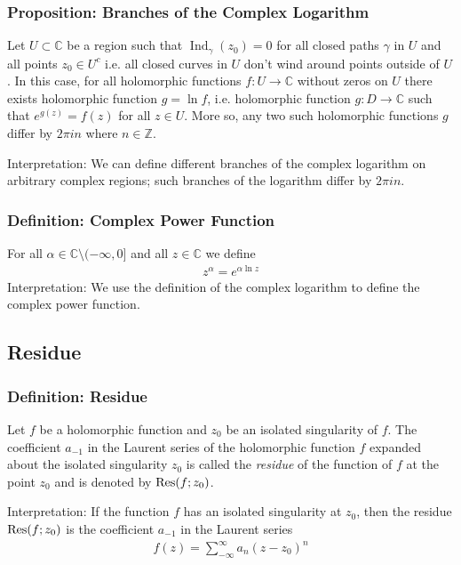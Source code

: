 \documentclass[11pt, a4paper]{article}
\newcommand{\C}{\mathbb{C}} %
\begin{document}
\subsubsection{Proposition: Branches of the Complex Logarithm}
Let $ U \subset \C $ be a region such that $ \operatorname{Ind}_{\gamma}(z_0) = 0$ for all closed paths $ \gamma $ in $ U $ and all points $ z_0 \in U^{c} $ i.e.  all closed curves in $ U $ don't wind around points outside of $ U $. In this case, for all holomorphic functions $ f: U \to \C $ without zeros on $ U $ there exists holomorphic function $ g = \ln f $, i.e. holomorphic function $ g: D \to \C $ such that $ e^{g(z)} = f(z) $ for all $ z \in U $. More so, any two such holomorphic functions $ g $ differ by $ 2\pi i n $ where $ n \in \mathbb{Z} $. 

Interpretation: We can define different branches of the complex logarithm on arbitrary complex regions; such branches of the logarithm differ by $ 2\pi in $.

\subsubsection{Definition: Complex Power Function}
For all $ \alpha \in \C \setminus (-\infty, 0]$ and all $ z \in \C $ we define
\begin{align*}
	z^{\alpha} = e^{\alpha \ln z}
\end{align*}
Interpretation: We use the definition of the complex logarithm to define the complex power function.


\subsection{Residue}

\subsubsection{Definition: Residue}
Let $ f $ be a holomorphic function and $ z_0 $ be an isolated singularity of $ f $. The coefficient $ a_{-1} $ in the Laurent series of the holomorphic function $ f $ expanded about the isolated singularity $ z_0 $ is called the \textit{residue} of the function of $ f $ at the point $ z_0 $ and is denoted by $ \Res(f; z_0) $.

Interpretation: If the function $ f $ has an isolated singularity at $ z_0 $, then the residue $ \Res(f; z_0) $ is the coefficient $ a_{-1} $ in the Laurent series
\begin{align*}
	f(z) = \sum_{-\infty}^{\infty} a_n (z-z_0)^n
\end{align*}
\end{document}
